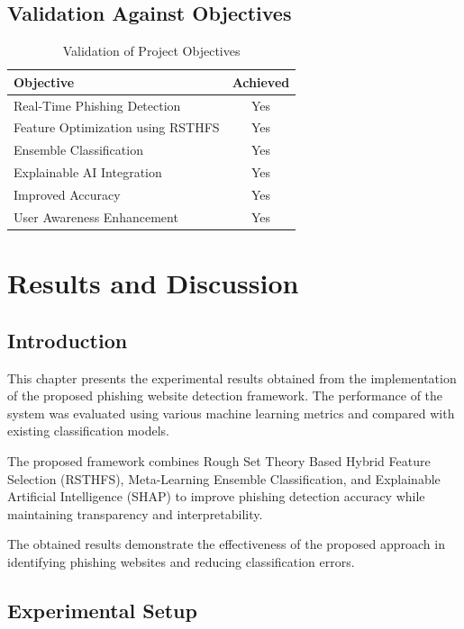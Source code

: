 \documentclass[12pt]{report}
\begin{document}
\section{Validation Against Objectives}

\begin{table}[H]
\centering
\caption{Validation of Project Objectives}
\begin{tabular}{|p{8cm}|c|}
\hline
Objective & Achieved \\
\hline
Real-Time Phishing Detection & Yes \\
\hline
Feature Optimization using RSTHFS & Yes \\
\hline
Ensemble Classification & Yes \\
\hline
Explainable AI Integration & Yes \\
\hline
Improved Accuracy & Yes \\
\hline
User Awareness Enhancement & Yes \\
\hline
\end{tabular}
\end{table}


\chapter{Results and Discussion}

\section{Introduction}

This chapter presents the experimental results obtained from the implementation of the proposed phishing website detection framework. The performance of the system was evaluated using various machine learning metrics and compared with existing classification models.

The proposed framework combines Rough Set Theory Based Hybrid Feature Selection (RSTHFS), Meta-Learning Ensemble Classification, and Explainable Artificial Intelligence (SHAP) to improve phishing detection accuracy while maintaining transparency and interpretability.

The obtained results demonstrate the effectiveness of the proposed approach in identifying phishing websites and reducing classification errors.

\section{Experimental Setup}
\end{document}
